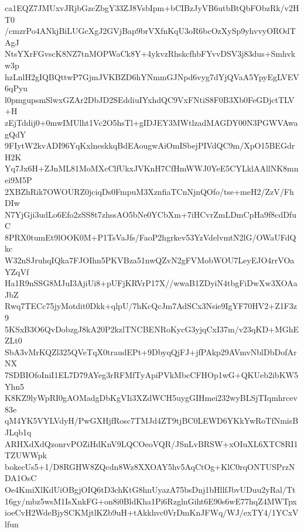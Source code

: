 ca1EQZ7JMUxvJRjbGzcZbgY33ZJ8VsbIpm+bCIBzJyVB6utbBtQbFObzRk/v2HT0
/cmzrPo4ANkjBiLUGcXgJ2GVjBap9brVXfnKqU3oR6bcOzXySp9yhvvyOROdTAgJ
NtsYXrFGvscK8NZ7tnMOPWaCk8Y+4ykvzRhskcfhbFYvvDSV3j83dus+Smhvkw3p
hzLnlH2gIQBQttwP7GjmJVKBZD6hYNmmGJNpd6vyg7dYjQVaA5YpyEgLVEV6qPyu
l0pmgupsmSlwxGZAr2DbJD2SEddiuIYxhdQC9VxFNtiS8F0B3Xb0FeGDjctTLV+H
zEjTddij0+0mwIMUlht1Vc2O5hsTl+gIDJEY3MWtlzadMAGDY00N3PGWVAwagQdY
9FIytW2kvADI96YqKxlneskkqBdEAougwAiOmISbejPIVdQC9m/XpO15BEGdrH2K
Yq7Jx6H+ZJnML81MoMXcClfUkxJVKnH7CfHmWWJ0YeE5CYLklAAllNK8mnei9M5P
2XBZhRik7OWOURZ0jciqDs0FmpuM3XznfiaTCnNjnQOfo/tse+meH2/ZzV/FhDIw
N7YjGji3udLo6Efo2zSS8t7zhssAO5bNe0YCbXm+7iHCvrZmLDmCpHa9f8cdDfuC
8PRX0tumEt9lOOK0M+P1TsVaJfs/FaoP2hgrkev53YzVdelvmtN2lG/OWaUFdQkc
W32nSJruhqIQka7FJOIhn5PKVBza51nwQZvN2gFVMobWOU7LeyEJO4rrVOaYZqVf
Ha1R9nSSG8MJuI3AjiUi8+pUFjKRVrP17X//wwaB1ZDyiN4tbgFiDwXw3XOAaJbZ
Rwq7TECc75jyMotdit0Dkk+qlpU/7hKcQcJm7AdSCx3Nsie9IgYF70HV2+Z1F3z9
5KSxB3O6QvDobzgJ8kA20P2kzlTNCBENRoKycG3yjqCxI37m/v23qKD+MGhEZLt0
SbA3vMrKQZl325QVeTqX0traudEPt+9DbyqQjFJ+jfPAkp29AVmvNblDbDofArNX
7SDBIOfoIniI1EL7D79AYeg3rRFMfTyApiPVkMbcCFHOp1wG+QKUeb2ibKW5Yhn5
K8KZ9lyWpRI0gAOMadgDbKgVIi3XZdWCH5uygGIHmei232wyBLSjTIqmhrcev83e
qM4YK5VYLVdyH/PwGXHjfRosc7TMJd4ZT9tjBC0LEWD6YKkYwRoTfNmisBJLqb1q
ARHXdXdQzonrvPOZiHdKnV9LQCOeoVQR/JSnLvBRSW+xOIuXL6XTC8RI1TZUWWpk
bokecUs5+1/D8RGHW8ZQcdn8Wz8XXOAY5hv5AqCtOg+KlC0rqONTUSPrzNDA1OsC
Oe4KmiXlKdUiOBgjOIQ6tD3chKtG8hnUyazA75bsDnj1bHllfJbvUDuu2yRal/Tt
16gy/mbz5wsM1IsXnkFG+on8i0BldKha1Pi6RzglnGiht6E90s6wE77hqZ4MWTpx
ioeCvH2WdeBjySCKMjtlKZb9uH+tAkkhvc0VrDmKnJFWq/WJ/exTY4/1YCxVlfun

